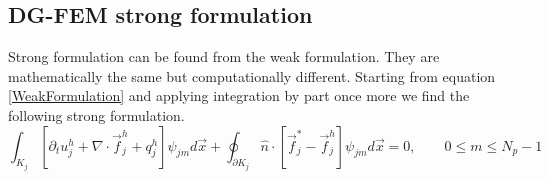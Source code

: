 \documentclass[BoSSSForSolvingConservationLaws.tex]{subfiles}
\begin{document}
\begin{comment}

\subsubsection*{Quadrature free formulation}
In the following we choose modal representation and substitute the polynomial representations of the solution $u_j^h(\vec{x},t)$, physical flux function $\vec{f}_j^h$ and source term $q_j^h(\vec{x},t)$ of element $j$.\\
\begin{align*}
  \partial_t \hat u_{jm}
  &-\sum_{n=0}^{N_p-1} \hat f_{jn}^1 \int_{K_j} \phi_{jn}(\vec{x})\frac{ \partial \phi_{jm}(\vec{x})}{\partial x_1} d(\vec{x}) \\
  &-\sum_{n=0}^{N_p-1} \hat f_{jn}^2 \int_{K_j} \phi_{jn}(\vec{x})\frac{ \partial \phi_{jm}(\vec{x})}{\partial x_2} d(\vec{x}) \\
  &-\sum_{n=0}^{N_p-1} \hat f_{jn}^3 \int_{K_j} \phi_{jn}(\vec{x})\frac{ \partial \phi_{jm}(\vec{x})}{\partial x_3} d(\vec{x}) \\
  &+\hat q_{jm}+\oint_{\partial K_j} \hat{n}\cdot \vec{f}_j^* \phi_{jm}(\vec{x}) d(\vec{x})=0, \qquad 0\leq m \leq N_p-1
\end{align*}

A matrix representation
\begin{subequations}
\label{MatrixRepresentation}
\begin{align}
&\partial_t U_j-\sum_{l=1}^{d} (S_j^l)^T F_j^l +Q_j+F_j^*=0 \\
&S_{jmn}^l=\int_{K_j} \phi_{jm}(\vec{x}) \frac{\partial \phi_{jn}(\vec{x})}{\partial x_l} d(\vec{x}), \qquad 1\leq m,n \leq N_p \\
&F_{jm}^*=\oint_{\partial K_j} \hat{n}\cdot \vec{f}^* \phi_{jm}(\vec{x}) d(\vec{x}), \qquad 0\leq m \leq N_p-1
\end{align}
\end{subequations}
$S$ is called stiffness matrix.

\end{comment}

\subsection{DG-FEM strong formulation}
Strong formulation can be found from the weak formulation. They are mathematically the same but computationally different. Starting from equation \eqref{WeakFormulation} and applying integration by part once more we find the following strong formulation.\\
\[
\int_{K_j} [\partial_t u_j^h +\nabla\cdot\vec{f}_j^h +q_j^h ] \psi_{jm} d\vec{x}
+\oint_{\partial K_j} \hat{n}\cdot [\vec{f}_j^*-\vec{f}_j^h] \psi_{jm} d\vec{x}=0, \qquad 0\leq m \leq N_p-1
\]
\end{document}
